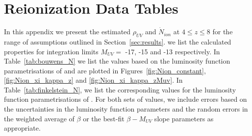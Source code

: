 
\chapter[Reionization Data Tables]{Reionization Data Tables} 
\label{}

In this appendix we present the estimated $\rho_{UV}$ and $\dot{N}_{ion}$ at $4 \leq z \leq 8$ for the range of assumptions outlined in Section~\ref{sec:results}.  we list the calculated properties for integration limits $M_{UV} =$ -17, -15 and -13 respectively. In Table~\ref{tab:bouwens_N} we list the values based on the luminosity function parametrisations of \citet{Bouwens:2014tx} and are plotted in Figures~\ref{fig:Nion_constant}, \ref{fig:Nion_xi_kappa_z} and \ref{fig:Nion_xi_kappa_zMuv}. In Table~\ref{tab:finkelstein_N}, we list the corresponding values for the luminosity function parametrisations of \citep{Finkelstein:2014ub}.
For both sets of values, we include errors based on the uncertainties in the luminosity function parameters and the random errors in the weighted average of $\beta$ or the best-fit $\beta-M_{UV}$ slope parameters \citep{Bouwens:2013vf} as appropriate.

